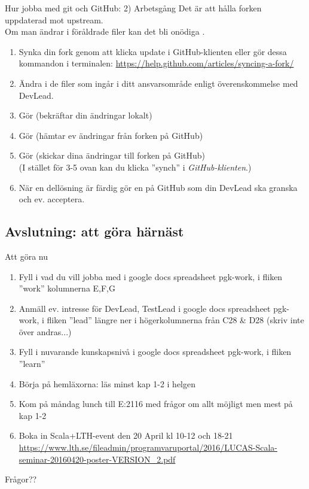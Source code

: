 \documentclass{slides}
\begin{document}
\begin{Slide}{Hur jobba med git och GitHub: 2) Arbetsgång}\footnotesize
Det är  att hålla forken uppdaterad mot upstream.\\
Om man ändrar i föråldrade filer kan det bli onödiga .
\begin{enumerate}
\item Synka din fork genom att klicka update i GitHub-klienten eller gör dessa kommandon i terminalen: \url{https://help.github.com/articles/syncing-a-fork/}
\item Ändra i de filer som ingår i ditt ansvarsområde enligt överenskommelse med DevLead.
\item Gör  (bekräftar din ändringar lokalt)
\item Gör  (hämtar ev ändringar från forken på GitHub)
\item Gör  (skickar dina ändringar till forken på GitHub) \\
(I stället för 3-5 ovan kan du klicka ''synch'' i \emph{GitHub-klienten}.)
\item När en dellösning är färdig gör en  på GitHub som din DevLead ska granska och ev. acceptera.  
\end{enumerate}
\end{Slide}

\subsection{Avslutning: att göra härnäst}
\begin{Slide}{Att göra nu}
\begin{enumerate}
\item Fyll i vad du vill jobba med i google docs spreadsheet pgk-work, i fliken ''work'' kolumnerna E,F,G
\item Anmäll ev. intresse för DevLead, TestLead i google docs spreadsheet pgk-work, i fliken ''lead'' längre ner i högerkolumnerna från C28 \& D28 (skriv inte över andras...)
\item Fyll i nuvarande kunskapsnivå i google docs spreadsheet pgk-work, i fliken ''learn''
\item Börja på hemläxorna: läs minst kap 1-2 i helgen
\item Kom på måndag lunch till E:2116 med frågor om allt möjligt men mest på kap 1-2 
\item Boka in Scala+LTH-event den 20 April kl 10-12 och 18-21 \url{https://www.lth.se/fileadmin/programvaruportal/2016/LUCAS-Scala-seminar-20160420-poster-VERSION_2.pdf}
\end{enumerate}
Frågor??
\end{Slide}
\end{document}
